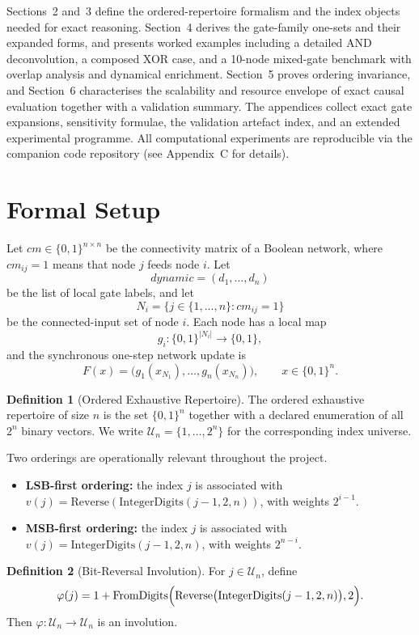\documentclass[11pt]{article}
\theoremstyle{definition}
\newtheorem{definition}{Definition}
\newcommand{\U}{\mathcal{U}_n}
\newcommand{\bits}{\{0,1\}}
\begin{document}
Sections~2 and~3 define the ordered-repertoire formalism and the index objects needed for exact reasoning. Section~4 derives the gate-family one-sets and their expanded forms, and presents worked examples including a detailed AND deconvolution, a composed XOR case, and a 10-node mixed-gate benchmark with overlap analysis and dynamical enrichment. Section~5 proves ordering invariance, and Section~6 characterises the scalability and resource envelope of exact causal evaluation together with a validation summary. The appendices collect exact gate expansions, sensitivity formulae, the validation artefact index, and an extended experimental programme. All computational experiments are reproducible via the companion code repository (see Appendix~C for details).

\section{Formal Setup}
Let \(cm \in \bits^{n \times n}\) be the connectivity matrix of a Boolean network, where \(cm_{ij}=1\) means that node \(j\) feeds node \(i\). Let
\[
dynamic=(d_1,\dots,d_n)
\]
be the list of local gate labels, and let
\[
N_i=\{j\in\{1,\dots,n\} : cm_{ij}=1\}
\]
be the connected-input set of node \(i\). Each node has a local map
\[
g_i:\bits^{|N_i|}\to\bits,
\]
and the synchronous one-step network update is
\[
F(x)=\bigl(g_1(x_{N_1}),\dots,g_n(x_{N_n})\bigr), \qquad x\in\bits^n.
\]

\begin{definition}[Ordered Exhaustive Repertoire]
The ordered exhaustive repertoire of size \(n\) is the set \(\bits^n\) together with a declared enumeration of all \(2^n\) binary vectors. We write \(\U=\{1,\dots,2^n\}\) for the corresponding index universe.
\end{definition}

Two orderings are operationally relevant throughout the project.
\begin{itemize}
\item \textbf{LSB-first ordering:} the index \(j\) is associated with \(v(j)=\mathrm{Reverse}(\mathrm{IntegerDigits}(j-1,2,n))\), with weights \(2^{i-1}\).
\item \textbf{MSB-first ordering:} the index \(j\) is associated with \(v(j)=\mathrm{IntegerDigits}(j-1,2,n)\), with weights \(2^{n-i}\).
\end{itemize}

\begin{definition}[Bit-Reversal Involution]
For \(j\in\U\), define
\[
\varphi(j)=1+\mathrm{FromDigits}\Bigl(\mathrm{Reverse}\bigl(\mathrm{IntegerDigits}(j-1,2,n)\bigr),2\Bigr).
\]
Then \(\varphi:\U\to\U\) is an involution.
\end{definition}
\end{document}
